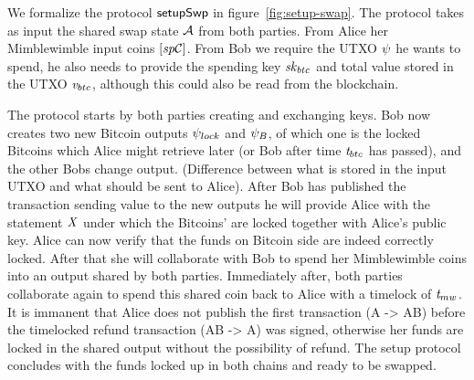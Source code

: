 We formalize the protocol $\mathsf{setupSwp}$ in figure~\ref{fig:setup-swap}.
The protocol takes as input the shared swap state $\mathcal{A}$ from both parties.
From Alice her Mimblewimble input coins $[\mathit{sp}\mathcal{C}]$.
From Bob we require the UTXO $\psi$ he wants to spend, he also needs to provide the spending key $\mathit{sk}_{btc}$ and total value stored in the UTXO $\mathit{v}_{btc}$, although this could also be read from the blockchain.

The protocol starts by both parties creating and exchanging keys.
Bob now creates two new Bitcoin outputs $\psi_{lock}$ and $\psi_{B}$, of which one is the locked Bitcoins which Alice might retrieve later (or Bob after time $\mathit{t}_{btc}$ has passed), and the other Bobs change output. (Difference between what is stored in the input UTXO and what should be sent to Alice).
After Bob has published the transaction sending value to the new outputs he will provide Alice with the statement $\mathit{X}$ under which the Bitcoins' are locked together with Alice's public key.
Alice can now verify that the funds on Bitcoin side are indeed correctly locked.
After that she will collaborate with Bob to spend her Mimblewimble coins into an output shared by both parties.
Immediately after, both parties collaborate again to spend this shared coin back to Alice with a timelock of $\mathit{t}_{mw}$.
It is immanent that Alice does not publish the first transaction (A -> AB) before the timelocked refund transaction (AB -> A) was signed, otherwise her funds are locked in the shared output without the possibility of refund.
The setup protocol concludes with the funds locked up in both chains and ready to be swapped.

